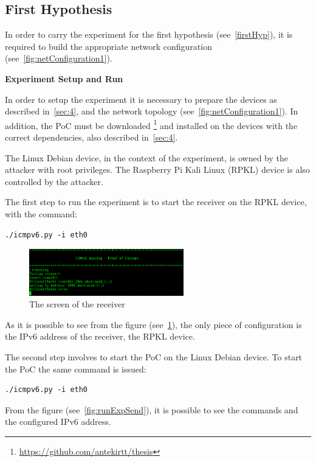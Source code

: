\documentclass[12pt]{article}
\begin{document}
\subsection{First Hypothesis}
\label{sub:firstHypExp}

In order to carry the experiment for the first hypothesis (see~\ref{firstHyp}), it is required to build the appropriate network configuration (see~\cref{fig:netConfiguration1}).

\textbf{Experiment Setup and Run}
\label{subsub:expRun}

In order to setup the experiment it is necessary to prepare the devices as described in~\cref{sec:4}, and the network topology (see~\cref{fig:netConfiguration1}). In addition, the PoC must be downloaded \footnote{\url{https://github.com/antekirtt/thesis}} and installed on the devices with the correct dependencies, also described in~\cref{sec:4}.

The Linux Debian device, in the context of the experiment, is owned by the attacker with root privileges. The Raspberry Pi Kali Linux (RPKL) device is also controlled by the attacker.

The first step to run the experiment is to start the receiver on the RPKL device, with the command:
\begin{lstlisting}[style=python,basicstyle=\ttfamily\small]
 ./icmpv6.py -i eth0
\end{lstlisting}

\begin{figure}[ht] 
\begin{center}
\includegraphics[width=0.6\textwidth]{runExpReceiver}
\caption{The screen of the receiver}
\label{fig:runExpRec}
\end{center}
\end{figure}

As it is possible to see from the figure (see~\cref{fig:runExpRec}), the only piece of configuration is the IPv6 address of the receiver, the RPKL device.

The second step involves to start the PoC on the Linux Debian device. To start the PoC the same command is issued:
\begin{lstlisting}[style=python,basicstyle=\ttfamily\small]
 ./icmpv6.py -i eth0
\end{lstlisting}
\vspace{-10pt}
From the figure (see~\cref{fig:runExpSend}), it is possible to see the commands and the configured IPv6 address.
\end{document}
